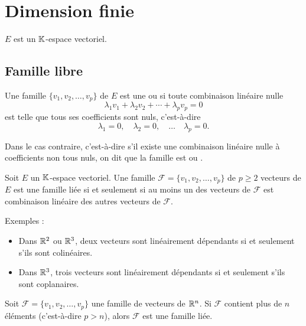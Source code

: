 \documentclass[10pt,class=article,crop=false]{standalone}
\begin{document}
	
\section{Dimension finie}

\begin{multicols}{2}
	
$E$ est un $\mathbb{K}$-espace vectoriel.

\subsection{Famille libre}

Une famille $\{ v_1, v_2,\ldots, v_p \}$ de $E$ est une  ou
 si toute combinaison linéaire nulle
$$\lambda_1 v_1+\lambda_2 v_2+\cdots+\lambda_p v_p=0$$
est telle que tous ses coefficients sont nuls, c'est-à-dire
$$\lambda_1=0, \quad \lambda_2=0, \quad \ldots \quad \lambda_p=0.$$

Dans le cas contraire,
c'est-à-dire s'il existe une combinaison linéaire nulle
à coefficients non tous nuls,
on dit que la famille est  ou .

\begin{theoreme}
	\label{carac liee}
	Soit $E$ un $\mathbb{K}$-espace vectoriel.
	Une famille $\mathcal{F}=\{v_1, v_2,\ldots, v_p\}$ de $p\ge 2$
	vecteurs de $E$ est une famille liée si et seulement si
	au moins un des vecteurs de $\mathcal{F}$ est combinaison linéaire
	des autres vecteurs de $\mathcal{F}$.
\end{theoreme}

Exemples :
\begin{itemize}
	\item Dans $\mathbb{R}^2$ ou $\mathbb{R}^3$, deux vecteurs sont linéairement dépendants si et seulement s'ils sont colinéaires.
	\item Dans $\mathbb{R}^3$, trois vecteurs sont linéairement dépendants si et seulement s'ils sont coplanaires.
\end{itemize}

\begin{proposition}
Soit $\mathcal{F}=\{ v_1, v_2,\ldots ,v_p\}$ une famille de vecteurs de $\mathbb{R}^n$. Si $\mathcal{F}$ contient plus de $n$ éléments (c'est-à-dire $p > n$), alors $\mathcal{F}$ est une famille liée.
\end{proposition}




\end{multicols}
\end{document}
